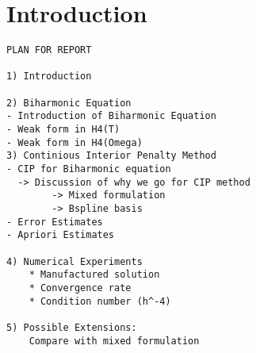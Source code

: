 \section{Introduction}\label{sec:introduction}




\begin{verbatim}
PLAN FOR REPORT

1) Introduction

2) Biharmonic Equation
- Introduction of Biharmonic Equation
- Weak form in H4(T)
- Weak form in H4(Omega)
3) Continious Interior Penalty Method
- CIP for Biharmonic equation
  -> Discussion of why we go for CIP method
        -> Mixed formulation
        -> Bspline basis
- Error Estimates
- Apriori Estimates

4) Numerical Experiments
    * Manufactured solution
    * Convergence rate
    * Condition number (h^-4)

5) Possible Extensions:
    Compare with mixed formulation
\end{verbatim}





